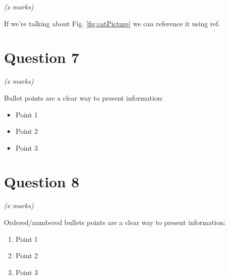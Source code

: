 \documentclass[11pt,fleqn]{book} %
\begin{document}
\begin{flushright}
    \textit{(x marks)}
\end{flushright}

If we're talking about Fig. \ref{fig:catPicture} we can reference it using ref.

\section{Question 7}

\begin{flushright}
    \textit{(x marks)}
\end{flushright}

Bullet points are a clear way to present information:

\vspace{0.5cm} %

\begin{itemize}
    \item Point 1
    \item Point 2
    \item Point 3
\end{itemize}

\section{Question 8}

\begin{flushright}
    \textit{(x marks)}
\end{flushright}

Ordered/numbered bullets points are a clear way to present information:

\vspace{0.5cm} %

\begin{enumerate}
    \item Point 1
    \item Point 2
    \item Point 3 \cite{catsProtection}
\end{enumerate}









\end{document}

